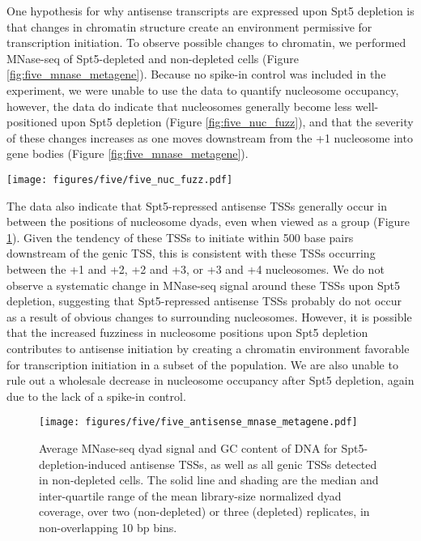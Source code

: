 One hypothesis for why antisense transcripts are expressed upon Spt5 depletion is that changes in chromatin structure create an environment permissive for transcription initiation.
To observe possible changes to chromatin, we performed MNase-seq of Spt5-depleted and non-depleted cells (Figure \ref{fig:five_mnase_metagene}).
Because no spike-in control was included in the experiment, we were unable to use the data to quantify nucleosome occupancy, however, the data do indicate that nucleosomes generally become less well-positioned upon Spt5 depletion (Figure \ref{fig:five_nuc_fuzz}), and that the severity of these changes increases as one moves downstream from the +1 nucleosome into gene bodies (Figure \ref{fig:five_mnase_metagene}).

\begin{SCfigure}[50][h]
    \texttt{[image: figures/five/five\_nuc\_fuzz.pdf]}
    \caption[Distributions of nucleosome fuzziness in Spt5-depleted and non-depleted cells.]{Distributions of nucleosome fuzziness in Spt5-depleted and non-depleted cells, quantified by DANPOS2 \citep{chen2013}.}
    \label{fig:five_nuc_fuzz}
\end{SCfigure}

The data also indicate that Spt5-repressed antisense TSSs generally occur in between the positions of nucleosome dyads, even when viewed as a group (Figure \ref{fig:five_antisense_mnase_metagene}).
Given the tendency of these TSSs to initiate within 500 base pairs downstream of the genic TSS, this is consistent with these TSSs occurring between the +1 and +2, +2 and +3, or +3 and +4 nucleosomes.
We do not observe a systematic change in MNase-seq signal around these TSSs upon Spt5 depletion, suggesting that Spt5-repressed antisense TSSs probably do not occur as a result of obvious changes to surrounding nucleosomes.
However, it is possible that the increased fuzziness in nucleosome positions upon Spt5 depletion contributes to antisense initiation by creating a chromatin environment favorable for transcription initiation in a subset of the population.
We are also unable to rule out a wholesale decrease in nucleosome occupancy after Spt5 depletion, again due to the lack of a spike-in control.
\begin{figure}[h]
    \texttt{[image: figures/five/five\_antisense\_mnase\_metagene.pdf]}
    \caption[Average MNase-seq dyad signal and GC content in Spt5-depleted and non-depleted cells, flanking all antisense TSSs upregulated in Spt5-depleted cells, as well as all genic TSSs detected in non-depleted cells.]{
        Average MNase-seq dyad signal and GC content of DNA for Spt5-depletion-induced antisense TSSs, as well as all genic TSSs detected in non-depleted cells. The solid line and shading are the median and inter-quartile range of the mean library-size normalized dyad coverage, over two (non-depleted) or three (depleted) replicates, in non-overlapping 10 bp bins.
}
    \label{fig:five_antisense_mnase_metagene}
\end{figure}

